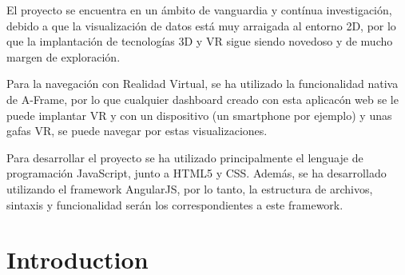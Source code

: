 \documentclass[a4paper, 12pt]{book}
\begin{document}
El proyecto se encuentra en un ámbito de vanguardia y contínua investigación, debido a que la visualización de datos está muy arraigada al entorno 2D, por lo que la implantación de tecnologías 3D y VR sigue siendo novedoso y de mucho margen de exploración.

Para la navegación con Realidad Virtual, se ha utilizado la funcionalidad nativa de A-Frame, por lo que cualquier dashboard creado con esta aplicacón web se le puede implantar VR y con un dispositivo (un smartphone por ejemplo) y unas gafas VR, se puede navegar por estas visualizaciones.

Para desarrollar el proyecto se ha utilizado principalmente el lenguaje de programación JavaScript, junto a HTML5 y CSS. Además, se ha desarrollado utilizando el framework AngularJS, por lo tanto, la estructura de archivos, sintaxis y funcionalidad serán los correspondientes a este framework.



\tableofcontents 
\cleardoublepage
\listoffigures %


\cleardoublepage
\chapter{Introduction}
\label{sec:intro} %
\end{document}

